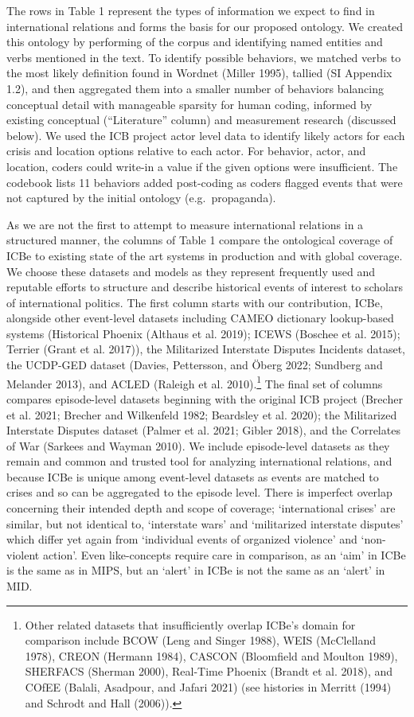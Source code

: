 \documentclass{article}
\begin{document}
The rows in Table 1 represent the types of information we expect to find
in international relations and forms the basis for our proposed
ontology. We created this ontology by performing of the corpus and
identifying named entities and verbs mentioned in the text. To identify
possible behaviors, we matched verbs to the most likely definition found
in Wordnet (Miller 1995), tallied (SI Appendix 1.2), and then aggregated
them into a smaller number of behaviors balancing conceptual detail with
manageable sparsity for human coding, informed by existing conceptual
(``Literature'' column) and measurement research (discussed below). We
used the ICB project actor level data to identify likely actors for each
crisis and location options relative to each actor. For behavior, actor,
and location, coders could write-in a value if the given options were
insufficient. The codebook lists 11 behaviors added post-coding as
coders flagged events that were not captured by the initial ontology
(e.g.~propaganda).

As we are not the first to attempt to measure international relations in
a structured manner, the columns of Table 1 compare the ontological
coverage of ICBe to existing state of the art systems in production and
with global coverage. We choose these datasets and models as they
represent frequently used and reputable efforts to structure and
describe historical events of interest to scholars of international
politics. The first column starts with our contribution, ICBe, alongside
other event-level datasets including CAMEO dictionary lookup-based
systems (Historical Phoenix (Althaus et al. 2019); ICEWS (Boschee et al.
2015); Terrier (Grant et al. 2017)), the Militarized Interstate Disputes
Incidents dataset, the UCDP-GED dataset (Davies, Pettersson, and Öberg
2022; Sundberg and Melander 2013), and ACLED (Raleigh et al.
2010).\footnote{Other related datasets that insufficiently overlap
  ICBe's domain for comparison include BCOW (Leng and Singer 1988), WEIS
  (McClelland 1978), CREON (Hermann 1984), CASCON (Bloomfield and
  Moulton 1989), SHERFACS (Sherman 2000), Real-Time Phoenix (Brandt et
  al. 2018), and COfEE (Balali, Asadpour, and Jafari 2021) (see
  histories in Merritt (1994) and Schrodt and Hall (2006)).} The final
set of columns compares episode-level datasets beginning with the
original ICB project (Brecher et al. 2021; Brecher and Wilkenfeld 1982;
Beardsley et al. 2020); the Militarized Interstate Disputes dataset
(Palmer et al. 2021; Gibler 2018), and the Correlates of War (Sarkees
and Wayman 2010). We include episode-level datasets as they remain and
common and trusted tool for analyzing international relations, and
because ICBe is unique among event-level datasets as events are matched
to crises and so can be aggregated to the episode level. There is
imperfect overlap concerning their intended depth and scope of coverage;
`international crises' are similar, but not identical to, `interstate
wars' and `militarized interstate disputes' which differ yet again from
`individual events of organized violence' and `non-violent action'. Even
like-concepts require care in comparison, as an `aim' in ICBe is the
same as in MIPS, but an `alert' in ICBe is not the same as an `alert' in
MID.
\end{document}
